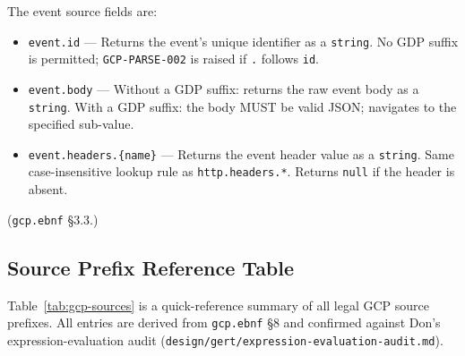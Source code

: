 \noindent The event source fields are:

\begin{itemize}
  \item \texttt{event.id} --- Returns the event's unique identifier as a
    \texttt{string}.
    No GDP suffix is permitted; \texttt{GCP-PARSE-002} is raised if
    \texttt{.} follows \texttt{id}.

  \item \texttt{event.body} --- Without a GDP suffix: returns the raw
    event body as a \texttt{string}.
    With a GDP suffix: the body MUST be valid JSON;
    navigates to the specified sub-value.

  \item \texttt{event.headers.\{name\}} --- Returns the event header value
    as a \texttt{string}.
    Same case-insensitive lookup rule as \texttt{http.headers.*}.
    Returns \texttt{null} if the header is absent.
\end{itemize}

(\texttt{gcp.ebnf} \S3.3.)

\subsection{Source Prefix Reference Table}
\label{subsec:gcp:sources:table}

Table~\ref{tab:gcp-sources} is a quick-reference summary of all legal
GCP source prefixes.
All entries are derived from \texttt{gcp.ebnf} \S8 and confirmed against
Don's expression-evaluation audit (\texttt{design/gert/expression-evaluation-audit.md}).

